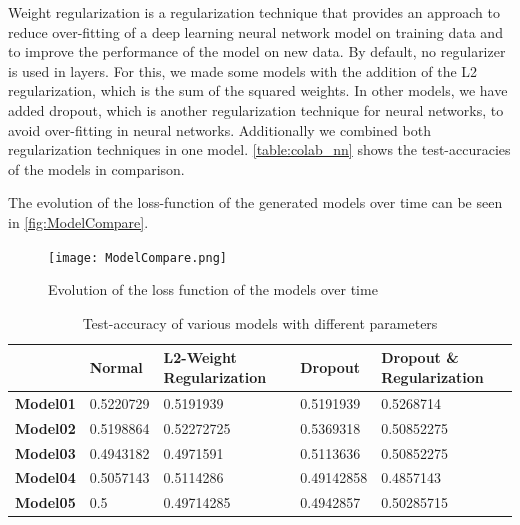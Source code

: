Weight regularization is a regularization technique that provides an approach to reduce over-fitting of a deep learning neural network model on training data and to improve the performance of the model on new data.\newline
By default, no regularizer is used in layers. For this, we made some models with the addition of the L2 regularization, which is the sum of the squared weights.\newline \newline
In other models, we have added dropout, which is another regularization technique for neural networks, to avoid over-fitting in neural networks. Additionally we combined both regularization techniques in one model. \autoref{table:colab_nn} shows the test-accuracies of the models in comparison.

The evolution of the loss-function of the generated models over time can be seen in \autoref{fig:ModelCompare}.

\begin{figure}[H]
\begin{center}
\texttt{[image: ModelCompare.png]}
\end{center}
\caption{Evolution of the loss function of the models over time}
\label{fig:ModelCompare}
\end{figure}

\begin{table}
\centering
\label{table:colab_nn}
\begin{tabular}{|p{2cm}|p{2cm}|p{3cm}|p{2cm}|p{3cm}|}
\hline
 & \textbf{Normal} & \textbf{L2-Weight \newline Regularization} & \textbf{Dropout} & \textbf{Dropout \& \newline Regularization} \\ \hline
\textbf{Model01} & 0.5220729 & 0.5191939 & 0.5191939 & 0.5268714 \\ \hline
\textbf{Model02} & 0.5198864 & 0.52272725 & 0.5369318 & 0.50852275 \\ \hline
\textbf{Model03} & 0.4943182 & 0.4971591 & 0.5113636 & 0.50852275 \\ \hline
\textbf{Model04} & 0.5057143 & 0.5114286 & 0.49142858 & 0.4857143 \\ \hline
\textbf{Model05} & 0.5 & 0.49714285 & 0.4942857 & 0.50285715 \\ \hline

\end{tabular}
\caption{Test-accuracy of various models with different parameters}
\label{table:colab_nn}
\end{table}

